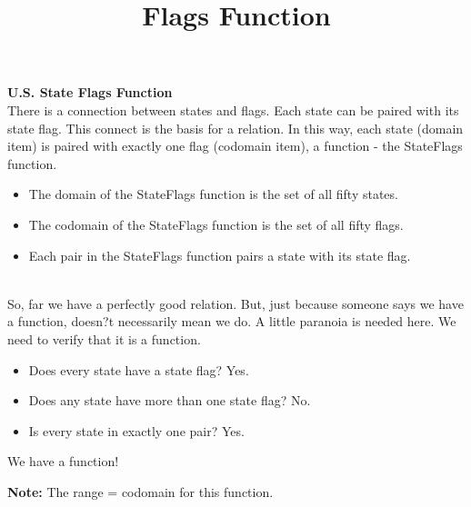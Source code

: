 \documentclass{ximera}
\title{Flags Function}
\begin{document}
\begin{abstract}
\end{abstract}

\maketitle




\textbf{U.S. State Flags Function} \\

There is a connection between states and flags.  Each state can be paired with its state flag.  This connect is the basis for a relation.
In this way, each state (domain item) is paired with exactly one flag (codomain item), a function - the StateFlags function.


\begin{definition} 
\begin{itemize}
\item The domain of the StateFlags function is the set of all fifty states.
\item The codomain of the StateFlags function is the set of all fifty flags.
\item Each pair in the StateFlags function pairs a state with its state flag.
\end{itemize}
\end{definition}
\quad \\

So, far we have a perfectly good relation. But, just because someone says we have a function, doesn?t necessarily mean we do.  A little paranoia is needed here. We need to verify that it is a function.

\begin{itemize}
\item Does every state have a state flag?  Yes.
\item Does any state have more than one state flag?  No.
\item Is every state in exactly one pair?  Yes.
\end{itemize}


We have a function! 

\textbf{Note:}  The range = codomain for this function.
\quad \\
\end{document}
